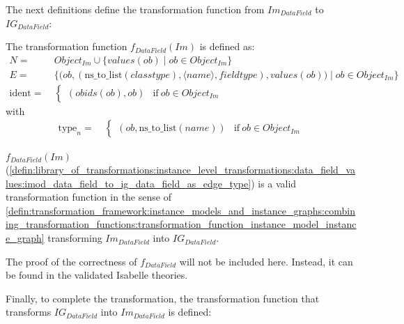 The next definitions define the transformation function from $Im_{DataField}$ to $IG_{DataField}$:

\begin{defin}
\label{defin:library_of_transformations:instance_level_transformations:data_field_values:imod_data_field_to_ig_data_field_as_edge_type}
The transformation function $f_{DataField}(Im)$ is defined as:
\begin{align*}
N =\ & Object_{Im} \cup \{values(ob) \mid ob \in Object_{Im}\}  \\
E =\ & \big\{\big(ob, (\mathrm{ns\_\!to\_\!list}(classtype), \langle name \rangle, fieldtype), values(ob)\big) \mid ob \in Object_{Im} \big\} \\
\mathrm{ident} =\ & \begin{cases}
    (obids(ob), ob) & \mathrm{if }\ ob \in Object_{Im}
\end{cases}
\end{align*}
with
\begin{align*}
\mathrm{type}_n =\ & \begin{cases}
    (ob, \mathrm{ns\_\!to\_\!list}(name)) & \mathrm{if }\ ob \in Object_{Im}
\end{cases}
\end{align*}
\end{defin}

\begin{thm}
\label{defin:library_of_transformations:instance_level_transformations:data_field_values:imod_data_field_to_ig_data_field_as_edge_type_func}
$f_{DataField}(Im)$ (\cref{defin:library_of_transformations:instance_level_transformations:data_field_values:imod_data_field_to_ig_data_field_as_edge_type}) is a valid transformation function in the sense of \cref{defin:transformation_framework:instance_models_and_instance_graphs:combining_transformation_functions:transformation_function_instance_model_instance_graph} transforming $Im_{DataField}$ into $IG_{DataField}$.
\end{thm}

The proof of the correctness of $f_{DataField}$ will not be included here. Instead, it can be found in the validated Isabelle theories.

Finally, to complete the transformation, the transformation function that transforms $IG_{DataField}$ into $Im_{DataField}$ is defined:

